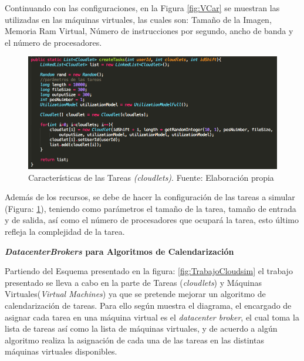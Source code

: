 Continuando con las configuraciones, en la Figura \ref{fig:VCar} se muestran las utilizadas en las máquinas virtuales, las cuales son: Tamaño de la Imagen, Memoria Ram Virtual, Número de instrucciones por segundo, ancho de banda y el número de procesadores.

\renewcommand\thefigure{\arabic{figure}}
\begin{figure}[h!]
	\centering
	\includegraphics[scale=0.4]{media/creacion_cloudlet}
	\caption{Características de las Tareas \textit{(cloudlets)}. Fuente: Elaboración propia}
	\label{fig:TCar}
\end{figure} 

Además de los recursos, se debe de hacer la configuración de las tareas a simular (Figura: \ref{fig:TCar}), teniendo como parámetros el tamaño de la tarea, tamaño de entrada y de salida, así como el número de procesadores que ocupará la tarea, esto último refleja la complejidad de la tarea.


\newpage


\textbf{\textit{DatacenterBrokers} para Algoritmos de Calendarización}

Partiendo del Esquema presentado en la figura: \ref{fig:TrabajoCloudsim} el trabajo presentado se lleva a cabo en la parte de Tareas (\textit{cloudlets}) y Máquinas Virtuales(\textit{Virtual Machines}) ya que se pretende mejorar un algoritmo de calendarización de tareas.
Para ello según muestra el diagrama, el encargado de asignar cada tarea en una máquina virtual es el \textit{datacenter broker}, el cual toma la lista de tareas así como la lista de máquinas virtuales, y de acuerdo a algún algoritmo realiza la asignación de cada una de las tareas en las distintas máquinas virtuales disponibles.

